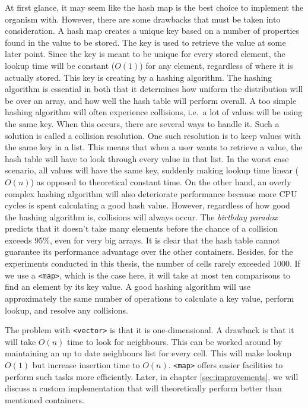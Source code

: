 At first glance, it may seem like the hash map is the best choice to implement the organism with. However, there are some drawbacks that must be taken into consideration. A hash map creates a unique key based on a number of properties found in the value to be stored. The key is used to retrieve the value at some later point. Since the key is meant to be unique for every stored element, the lookup time will be constant ($O(1)$) for any element, regardless of where it is actually stored. This key is creating by a hashing algorithm. The hashing algorithm is essential in both that it determines how uniform the distribution will be over an array, and how well the hash table will perform overall. A too simple hashing algorithm will often experience collisions, i.e.\ a lot of values will be using the same key. When this occurs, there are several ways to handle it. Such a solution is called a collision resolution. One such resolution is to keep values with the same key in a list. This means that when a user wants to retrieve a value, the hash table will have to look through every value in that list. In the worst case scenario, all values will have the same key, suddenly making lookup time linear ($O(n)$) as opposed to theoretical constant time. On the other hand, an overly complex hashing algorithm will also deteriorate performance because more CPU cycles is spent calculating a good hash value. However, regardless of how good the hashing algorithm is, collisions will always occur. The \emph{birthday paradox} predicts that it doesn't take many elements before the chance of a collision exceeds 95\%, even for very big arrays. It is clear that the hash table cannot guarantee its performance advantage over the other containers. Besides, for the experiments conducted in this thesis, the number of cells rarely exceeded 1000. If we use a \texttt{<map>}, which is the case here, it will take at most ten comparisons to find an element by its key value. A good hashing algorithm will use approximately the same number of operations to calculate a key value, perform lookup, and resolve any collisions.

The problem with \texttt{<vector>} is that it is one-dimensional. A drawback is that it will take $O(n)$ time to look for neighbours. This can be worked around by maintaining an up to date neighbours list for every cell. This will make lookup $O(1)$ but increase insertion time to $O(n)$. \texttt{<map>} offers easier facilities to perform such tasks more efficiently. Later, in chapter \ref{sec:improvements}, we will discuss a custom implementation that will theoretically perform better than mentioned containers.

